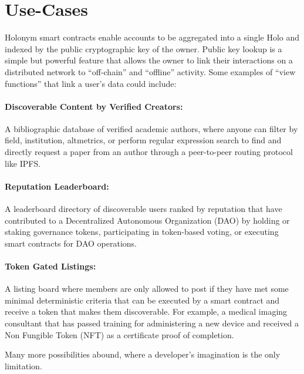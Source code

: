 \documentclass[11pt,oneside,a4paper]{article}
\begin{document}
	\section*{Use-Cases}	
	Holonym smart contracts enable accounts to be aggregated into a single Holo and indexed by the public cryptographic key of the owner. Public key lookup is a simple but powerful feature that allows the owner to link their interactions on a distributed network to “off-chain” and “offline” activity. Some examples of “view functions” that link a user’s data could include:

\paragraph{Discoverable Content by Verified Creators:} A bibliographic database of verified academic authors, where anyone can filter by field, institution, altmetrics, or perform regular expression search to find and directly request a paper from an author through a peer-to-peer routing protocol like IPFS.

\paragraph{Reputation Leaderboard:} A leaderboard directory of discoverable users ranked by reputation that have contributed to a Decentralized Autonomous Organization (DAO) by holding or staking governance tokens, participating in token-based voting, or executing smart contracts for DAO operations.

\paragraph{Token Gated Listings:} A listing board where members are only allowed to post if they have met some minimal deterministic criteria that can be executed by a smart contract and receive a token that makes them discoverable. For example, a medical imaging consultant that has passed training for administering a new device and received a Non Fungible Token (NFT) as a certificate proof of completion.

Many more possibilities abound, where a developer’s imagination is the only limitation.
\end{document}

